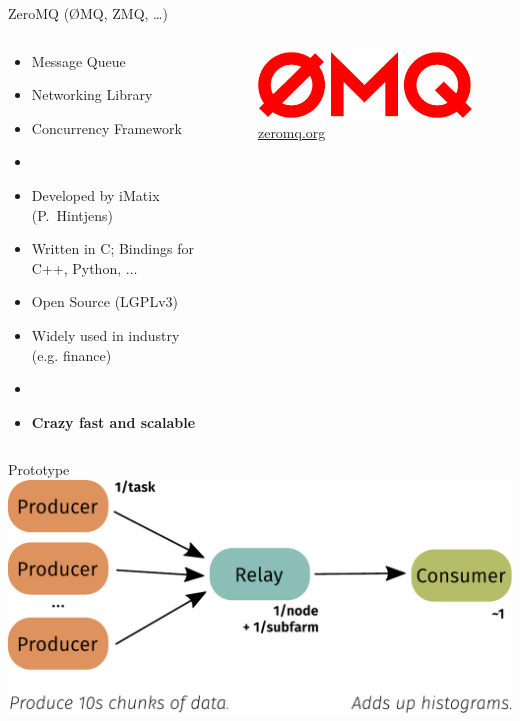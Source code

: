 \documentclass[aspectratio=1610,compress,titleprogressbar]{beamer}
\begin{document}
\begin{frame}{ZeroMQ (ØMQ, ZMQ, \dots)} 
  \begin{columns}
    \begin{column}{.6\textwidth}
      \begin{itemize}
        \item Message Queue
        \item Networking Library
        \item Concurrency Framework
        \item [] {}
        \item Developed by iMatix (P.~Hintjens)
        \item Written in C; Bindings for C++, Python, ...
        \item Open Source (LGPLv3)
        \item Widely used in industry (e.g. finance)
        \item [] {}
        \item \textbf{Crazy fast and scalable}
      \end{itemize}
    \end{column}
    \begin{column}{.4\textwidth}
      \begin{figure}
        \centering
        \includegraphics[width=.8\textwidth]{graphics/zmq.png}
        \caption{\href{http://zeromq.org}{zeromq.org}}
      \end{figure}
    \end{column}
  \end{columns}
\end{frame}

\begin{frame}{Prototype}
  \includegraphics[width=\textwidth]{graphics/flow.pdf}
\end{frame}
\end{document}
